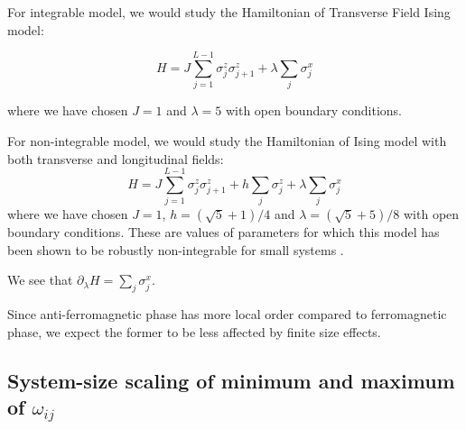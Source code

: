 \documentclass[11pt,a4paper]{article}
\begin{document}
For integrable model, we would study the Hamiltonian of Transverse Field Ising model:

\begin{equation}
H= J \sum_{j=1}^{L-1} \sigma_j^z \sigma_{j+1}^z + \lambda \sum_{j} \sigma_j^x
\end{equation}


where we have chosen $J=1$ and $\lambda=5$ with open boundary conditions.

For non-integrable model, we would study the Hamiltonian of Ising model with both transverse and longitudinal fields:
\begin{equation}
H= J \sum_{j=1}^{L-1} \sigma_j^z \sigma_{j+1}^z + h\sum_{j} \sigma_j^z +\lambda \sum_{j} \sigma_j^x 
\end{equation}
%
where we have chosen $J=1$, $h= (\sqrt{5}+1)/4$ and $\lambda=(\sqrt{5}+5)/8$ with open boundary conditions. These are values of parameters for which this model has been shown to be robustly non-integrable for small systems \cite{kim2013ballistic}.

We see that $\partial_{\lambda}H =  \sum_{j} \sigma_j^x  $.

Since anti-ferromagnetic phase has more local order compared to ferromagnetic phase, we expect the former to be less affected by finite size effects.


\subsection{System-size scaling of minimum and maximum of $\omega_{ij}$}
\end{document}
